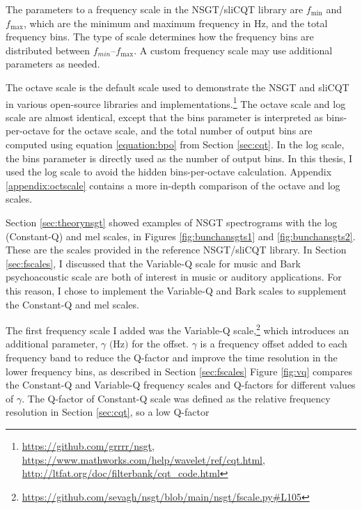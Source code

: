 \documentclass[report.tex]{subfiles}
\begin{document}
The parameters to a frequency scale in the NSGT/sliCQT library are $f_{\text{min}}$ and $f_{\text{max}}$, which are the minimum and maximum frequency in Hz, and the total frequency bins. The type of scale determines how the frequency bins are distributed between $f_{min}$--$f_{\text{max}}$. A custom frequency scale may use additional parameters as needed.

The octave scale is the default scale used to demonstrate the NSGT and sliCQT \parencite{balazs, slicq} in various open-source libraries and implementations.\footnote{\url{https://github.com/grrrr/nsgt}, \url{https://www.mathworks.com/help/wavelet/ref/cqt.html}, \url{http://ltfat.org/doc/filterbank/cqt_code.html}} The octave scale and log scale are almost identical, except that the bins parameter is interpreted as bins-per-octave for the octave scale, and the total number of output bins are computed using equation \eqref{equation:bpo} from Section \ref{sec:cqt}. In the log scale, the bins parameter is directly used as the number of output bins. In this thesis, I used the log scale to avoid the hidden bins-per-octave calculation. Appendix \ref{appendix:octscale} contains a more in-depth comparison of the octave and log scales.

Section \ref{sec:theorynsgt} showed examples of NSGT spectrograms with the log (Constant-Q) and mel scales, in Figures \ref{fig:bunchansgts1} and \ref{fig:bunchansgts2}. These are the scales provided in the reference NSGT/sliCQT library. In Section \ref{sec:fscales}, I discussed that the Variable-Q scale for music and Bark psychoacoustic scale are both of interest in music or auditory applications. For this reason, I chose to implement the Variable-Q and Bark scales to supplement the Constant-Q and mel scales.

The first frequency scale I added was the Variable-Q scale,\footnote{\url{https://github.com/sevagh/nsgt/blob/main/nsgt/fscale.py\#L105}} which introduces an additional parameter, $\gamma \text{ (Hz)}$ for the offset. $\gamma$ is a frequency offset added to each frequency band to reduce the Q-factor and improve the time resolution in the lower frequency bins, as described in Section \ref{sec:fscales} Figure \ref{fig:vq} compares the Constant-Q and Variable-Q frequency scales and Q-factors for different values of $\gamma$. The Q-factor of Constant-Q scale was defined as the relative frequency resolution in Section \ref{sec:cqt}, so a low Q-factor
\end{document}
